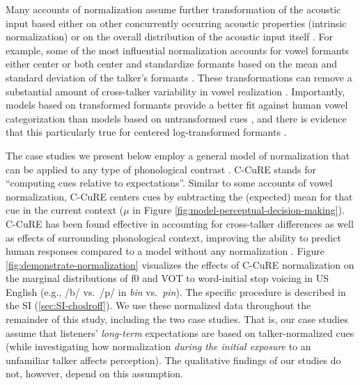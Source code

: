 \documentclass[
  11pt,
  man,floatsintext]{apa6}
\begin{document}
Many accounts of normalization assume further transformation of the acoustic input based either on other concurrently occurring acoustic properties (intrinsic normalization) or on the overall distribution of the acoustic input itself \autocites[extrinsic normalization, for review, see][]{weatherholtz-jaeger2016,clopper2009}. For example, some of the most influential normalization accounts for vowel formants either center \autocite[e.g.,][]{nearey1989} or both center and standardize formants based on the mean and standard deviation of the talker's formants \autocite[e.g.,][]{lobanov1971}. These transformations can remove a substantial amount of cross-talker variability in vowel realization \autocites[e.g.,][]{hoffmanbion-escudero2007,nearey1989,persson-jaeger2023}[for a particularly insightful review, see][]{barreda2020}. Importantly, models based on transformed formants provide a better fit against human vowel categorization than models based on untransformed cues \autocites[e.g.,][]{persson-jaeger2022,richter2017}, and there is evidence that this particularly true for centered log-transformed formants \autocite[i.e., Nearey's uniform scaling approach,][]{barreda2021}.

The case studies we present below employ a general model of normalization that can be applied to any type of phonological contrast \autocites[C-CuRE,][]{cole2010,mcmurray-jongman2011}. C-CuRE stands for ``computing cues relative to expectations''. Similar to some accounts of vowel normalization, C-CuRE centers cues by subtracting the (expected) mean for that cue in the current context (\(\mu\) in Figure \ref{fig:model-perceptual-decision-making}). C-CuRE has been found effective in accounting for cross-talker differences as well as effects of surrounding phonological context, improving the ability to predict human responses compared to a model without any normalization \autocites{mcmurray-jongman2011}[see also][]{apfelbaum-mcmurray2015,crinnion2020,kleinschmidt2020,mcmurray-jongman2016,xie2021cognition}. Figure \ref{fig:demonstrate-normalization} visualizes the effects of C-CuRE normalization on the marginal distributions of f0 and VOT to word-initial stop voicing in US English (e.g., /b/ vs.~/p/ in \emph{bin} vs.~\emph{pin}). The specific procedure is described in the SI (\ref{sec:SI-chodroff}). We use these normalized data throughout the remainder of this study, including the two case studies. That is, our case studies assume that listeners' \emph{long-term} expectations are based on talker-normalized cues (while investigating how normalization \emph{during the initial exposure} to an unfamiliar talker affects perception). The qualitative findings of our studies do not, however, depend on this assumption.
\end{document}
